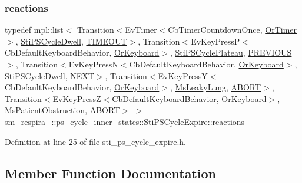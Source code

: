 \subsubsection{\texorpdfstring{reactions}{reactions}}
{\footnotesize\ttfamily typedef mpl\+::list$<$ Transition$<$Ev\+Timer$<$Cb\+Timer\+Countdown\+Once, \hyperlink{classsm__respira__1_1_1OrTimer}{Or\+Timer}$>$, \hyperlink{structsm__respira__1_1_1ps__cycle__inner__states_1_1StiPSCycleDwell}{Sti\+P\+S\+Cycle\+Dwell}, \hyperlink{structsm__respira__1_1_1ps__cycle__inner__states_1_1StiPSCycleExpire_1_1TIMEOUT}{T\+I\+M\+E\+O\+UT}$>$, Transition$<$Ev\+Key\+PressP$<$Cb\+Default\+Keyboard\+Behavior, \hyperlink{classsm__respira__1_1_1OrKeyboard}{Or\+Keyboard}$>$, \hyperlink{structsm__respira__1_1_1ps__cycle__inner__states_1_1StiPSCyclePlateau}{Sti\+P\+S\+Cycle\+Plateau}, \hyperlink{structsm__respira__1_1_1ps__cycle__inner__states_1_1StiPSCycleExpire_1_1PREVIOUS}{P\+R\+E\+V\+I\+O\+US}$>$, Transition$<$Ev\+Key\+PressN$<$Cb\+Default\+Keyboard\+Behavior, \hyperlink{classsm__respira__1_1_1OrKeyboard}{Or\+Keyboard}$>$, \hyperlink{structsm__respira__1_1_1ps__cycle__inner__states_1_1StiPSCycleDwell}{Sti\+P\+S\+Cycle\+Dwell}, \hyperlink{structsm__respira__1_1_1ps__cycle__inner__states_1_1StiPSCycleExpire_1_1NEXT}{N\+E\+XT}$>$, Transition$<$Ev\+Key\+PressY$<$Cb\+Default\+Keyboard\+Behavior, \hyperlink{classsm__respira__1_1_1OrKeyboard}{Or\+Keyboard}$>$, \hyperlink{classsm__respira__1_1_1MsLeakyLung}{Ms\+Leaky\+Lung}, \hyperlink{classABORT}{A\+B\+O\+RT}$>$, Transition$<$Ev\+Key\+PressZ$<$Cb\+Default\+Keyboard\+Behavior, \hyperlink{classsm__respira__1_1_1OrKeyboard}{Or\+Keyboard}$>$, \hyperlink{classsm__respira__1_1_1MsPatientObstruction}{Ms\+Patient\+Obstruction}, \hyperlink{classABORT}{A\+B\+O\+RT}$>$ $>$ \hyperlink{structsm__respira__1_1_1ps__cycle__inner__states_1_1StiPSCycleExpire_af06d5dccfc337830ff4b17405ff4ee7a}{sm\+\_\+respira\+\_\+::ps\+\_\+cycle\+\_\+inner\+\_\+states\+::\+Sti\+P\+S\+Cycle\+Expire\+::reactions}}



Definition at line 25 of file sti\+\_\+ps\+\_\+cycle\+\_\+expire.\+h.



\subsection{Member Function Documentation}
\mbox{\label{structsm__respira__1_1_1ps__cycle__inner__states_1_1StiPSCycleExpire_afb125ac4117a2a63ae17b1c60cd863c1}} 
